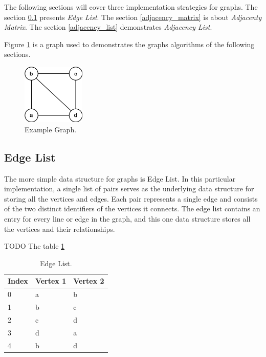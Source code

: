 \documentclass[a4paper]{article}
\begin{document}
    The following sections will cover three implementation strategies for graphs.
    The section \ref{edgelist} presents \emph{Edge List}.
    The section \ref{adjacency_matrix} is about \emph{Adjacenty Matrix}.
    The section \ref{adjacency_list} demonstrates \emph{Adjacency List}.

    Figure \ref{graph-algorithm-example} is a graph used to demonstrates
    the graphs algorithms of the following sections.

    \begin{figure}[H]
        \centering
        \includegraphics[width=30mm]{images/graphs-undirected.png}
        \vspace*{3mm}
        \caption{Example Graph.}
        \label{graph-algorithm-example}
    \end{figure}


    \subsection{Edge List} \label{edgelist}

    The more simple data structure for graphs is Edge List.
    In this particular implementation, a single list of pairs serves as the
    underlying data structure for storing all the vertices and edges. Each pair
    represents a single edge and consists of the two distinct identifiers of the
    vertices it connects. The edge list contains an entry for every line or edge
    in the graph, and this one data structure stores all the vertices and their
    relationships.

     TODO The table \ref{tab:edge-list}

    \begin{table}[H]
        \centering
        \caption{\label{tab:edge-list}Edge List.}
        \vspace*{10pt}
        \begin{tabular}{ |l|l|l| }
            \hline
            Index & Vertex 1 & Vertex 2 \\
            \hline
            0   & a & b \\
            \hline
            1   & b & c \\
            \hline
            2   & c & d \\
            \hline
            3   & d & a \\
            \hline
            4   & b & d \\
            \hline
        \end{tabular}
    \end{table}
\end{document}
